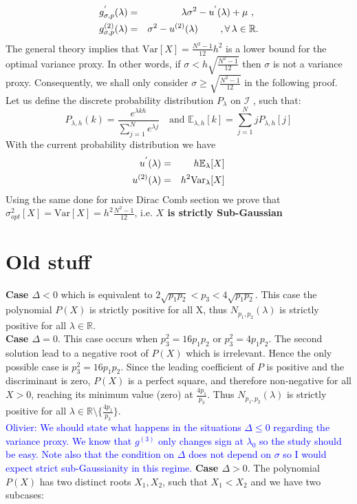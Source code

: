 \documentclass[a4paper, 10pt]{article}
\newcommand{\beq}{\begin{equation}}
\newcommand{\eeq}{\end{equation}}
\newcommand{\bea}{\begin{eqnarray}}
\newcommand{\eea}{\end{eqnarray}}
\theoremstyle{definition}
\begin{document}
\bea g^{'}_{\sigma,p}(\lambda) &=& \lambda \sigma^2 -u^{'}(\lambda) + \mu \,\,,\,\ \cr 
g^{(2)}_{\sigma,p}(\lambda) &=& \sigma^2 -u^{(2)}(\lambda) \ \ \ \ \ \  \ ,\forall \, \lambda\in \mathbb{R}. \eea The general theory implies that $\text{Var}[X]=\frac{N^2-1}{12} h^2$ is a lower bound for the optimal variance proxy. In other words, if $\sigma<h\sqrt{\frac{N^2-1}{12}}$ then $\sigma$ is not a variance proxy. Consequently, we shall only consider $\sigma\geq \sqrt{\frac{N^2-1}{12}}$ in the following proof.\\Let us define the discrete probability distribution  $P_{\lambda}$ on $\mathcal{I}$ , such that: \beq P_{\lambda, h}(k) = \frac{e^{\lambda kh}}{\sum_{j=1}^{N} e^{\lambda j}} \ \ \ \text{ and } \mathbb{E}_{\lambda, h}[k] = {\sum_{j=1}^{N} j P_{\lambda, h}[j]}\eeq
With the current probability distribution we have
\bea u^{'}(\lambda) &=& h\mathbb{E}_{\lambda}[X] \cr 
u^{(2)}(\lambda) &=& h^2 \text{Var}_{\lambda}[X]
\eea 
Using the same done for naive Dirac Comb section we prove that $\sigma^2_{opt}[X]=\text{Var}[X]=h^2\frac{N^2-1}{12}$, i.e. \textbf{$X$ is strictly Sub-Gaussian}
\newpage
\section{Old stuff}
\textbf{Case $\Delta < 0$} which is equivalent to  $2\sqrt{p_1p_2} < p_3 < 4\sqrt{p_1p_2}$. This case the polynomial $P(X)$ is strictly positive for all X, thus $N_{p_1, p_2}(\lambda)$ is strictly positive for all $\lambda \in \mathbb{R}.$\\
\textbf{Case $\Delta = 0$}. This case occurs when $p_3^2=16p_1p_2$ or $p_3^2=4p_1p_2$. The second solution lead to a negative root of $P(X)$ which is irrelevant. Hence the only possible case is $p_3^2=16p_1p_2$. Since the leading coefficient of $P$ is positive and the discriminant is zero, $P(X)$ is a perfect square, and therefore non-negative for all $X>0$, reaching its minimum value (zero) at $\frac{4p_1}{p_3}$. Thus $N_{p_1, p_2}(\lambda)$ is strictly positive for all $\lambda \in \mathbb{R}\setminus\{\frac{4p_1}{p_3}\}$.\\
\textcolor{blue}{Olivier: We should state what happens in the situations $\Delta\leq 0$ regarding the variance proxy. We know that $g^{(3)}$ only changes sign at $\lambda_0$ so the study should be easy. Note also that the condition on $\Delta$ does not depend on $\sigma$ so I would expect strict sub-Gaussianity in this regime.}
\textbf{Case $\Delta > 0$}. The polynomial $P(X)$ has two distinct roots $X_1, X_2$, such that $X_1 < X_2$ and we have two subcases:
\end{document}
